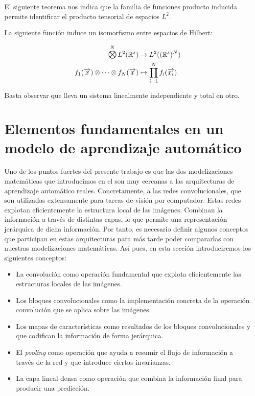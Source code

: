 El siguiente teorema nos indica que la familia de funciones producto inducida permite identificar el producto tensorial de espacios $L^2$.

\begin{teorema}
	La siguiente función induce un isomorfismo entre espacios de Hilbert:

	\begin{equation}
		\begin{split}
			\MediumOtimes^{N} L^2(\R^s) &\to L^2((\R^s)^N) \\
			f_1(\nv{x}) \otimes \cdots \otimes f_N(\nv{x}) &\mapsto \prod_{i = 1}^N f_i(\nv{x_i}).
		\end{split}
	\end{equation}

	Basta observar que lleva un sistema linealmente independiente y total en otro.
\end{teorema}

\section{Elementos fundamentales en un modelo de aprendizaje automático} \label{sec:piezas_machine_learning_matematicas}

Uno de los puntos fuertes del presente trabajo es que las dos modelizaciones matemáticas que introducimos en el  son muy cercanas a las arquitecturas de aprendizaje automático reales. Concretamente, a las redes convolucionales, que son utilizadas extensamente para tareas de visión por computador. Estas redes explotan eficientemente la estructura local de las imágenes. Combinan la información a través de distintas capas, lo que permite una representación jerárquica de dicha información. Por tanto, es necesario definir algunos conceptos que participan en estas arquitecturas para más tarde poder compararlas con nuestras modelizaciones matemáticas. Así pues, en esta sección introduciremos los siguientes conceptos:

\begin{itemize}
    \item La convolución como operación fundamental que explota eficientemente las estructuras locales de las imágenes.
    \item Los bloques convolucionales como la implementación concreta de la operación convolución que se aplica sobre las imágenes.
    \item Los mapas de características como resultados de los bloques convolucionales y que codifican la información de forma jerárquica.
    \item El \textit{pooling} como operación que ayuda a resumir el flujo de información a través de la red y que introduce ciertas invarianzas.
    \item La capa lineal densa como operación que combina la información final para producir una predicción.
\end{itemize}

